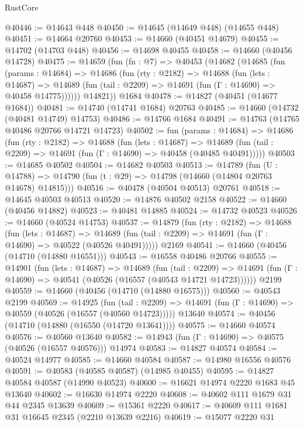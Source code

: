 \begin{lexlean}{RustCore}
\begin{coremodule}
@40446 := @14643 @448
@40450 := @14645 (@14649 @448) (@14655 @448)
@40451 := @14664 @20760
@40453 := @14660 (@40451 @14679)
@40455 := @14702 (@14703 @448)
@40456 := @14698 @40455
@40458 := @14660 (@40456 @14728)
@40475 := @14659
    (fun (fn : @7) =>
    @40453
      (@14682
        (@14685
          (fun (params : @14684) =>
          @14686
            (fun (rty : @2182) =>
            @14688
              (fun (lets : @14687) =>
              @14689 (fun (tail : @2209) => @14691 (fun (Γ : @14690) => @40458 @14775))))))
        @14821))
    @1684
@40478 := @14827 (@40451 (@14677 @1684))
@40481 := @14740 (@14741 @1684) @20763
@40485 := @14660 (@14732 (@40481 @14749) @14753)
@40486 := @14766 @1684
@40491 := @14763 (@14765 @40486 @20766 @14721 @14723)
@40502 := fun (params : @14684) =>
  @14686
    (fun (rty : @2182) =>
    @14688
      (fun (lets : @14687) =>
      @14689 (fun (tail : @2209) => @14691 (fun (Γ : @14690) => @40458 (@40485 @40491)))))
@40503 := @14685 @40502
@40504 := @14682 @40503
@40513 := @14789
    (fun (U : @14788) => @14790 (fun (t : @29) => @14798 (@14660 (@14804 @20763 @14678) @14815)))
@40516 := @40478 (@40504 @40513) @20761
@40518 := @14645 @40503 @40513
@40520 := @14876 @40502 @2158
@40522 := @14660 (@40456 @14882)
@40523 := @40481 @14885
@40524 := @14732 @40523
@40526 := @14660 (@40524 @14753)
@40537 := @14879
    (fun (rty : @2182) =>
    @14688
      (fun (lets : @14687) =>
      @14689 (fun (tail : @2209) => @14691 (fun (Γ : @14690) => @40522 (@40526 @40491)))))
    @2169
@40541 := @14660 (@40456 (@14710 (@14880 @16551)))
@40543 := @16558 @40486 @20766
@40555 := @14901
    (fun (lets : @14687) =>
    @14689
      (fun (tail : @2209) =>
      @14691 (fun (Γ : @14690) => @40541 (@40526 (@16557 (@40543 @14721 @14723))))))
    @2199
@40559 := @14660 (@40456 (@14710 (@14880 @16575)))
@40560 := @40543 @2199
@40569 := @14925
    (fun (tail : @2209) => @14691 (fun (Γ : @14690) => @40559 (@40526 (@16557 (@40560 @14723)))))
    @13640
@40574 := @40456 (@14710 (@14880 (@16550 (@14720 @13641))))
@40575 := @14660 @40574
@40576 := @40560 @13640
@40582 := @14943 (fun (Γ : @14690) => @40575 (@40526 (@16557 @40576))) @14974
@40583 := @14827 @40574
@40584 := @40524 @14977
@40585 := @14660 @40584
@40587 := @14980 @16556 @40576
@40591 := @40583 (@40585 @40587) (@14985 @40455)
@40595 := @14827 @40584 @40587 (@14990 @40523)
@40600 := @16621 @14974 @2220 @1683 @45 @13640
@40602 := @16630 @14974 @2220
@40608 := @40602 @111 @1679 @31 @44 @2345 @13639
@40609 := @15361 @2220
@40617 := @40609 @111 @1681 @31 @16645 @2345 (@2210 @13639 @2216)
@40619 := @15077 @2220 @31

\end{coremodule}
\end{lexlean}
